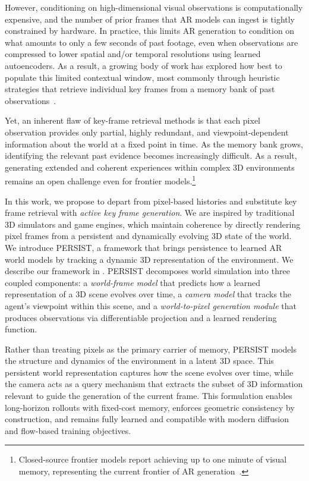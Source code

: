 \documentclass{article}
\theoremstyle{plain}
\theoremstyle{definition}
\theoremstyle{remark}
\begin{document}
However, conditioning on high-dimensional visual observations is computationally expensive, and the number of prior frames that AR models can ingest is tightly constrained by hardware.
In practice, this limits AR generation to condition on what amounts to only a few seconds of past footage, even when observations are compressed to lower spatial and/or temporal resolutions using learned autoencoders.
As a result, a growing body of work has explored how best to populate this limited contextual window, most commonly through heuristic strategies that retrieve individual key frames from a memory bank of past observations~\citep{xiao2025worldmem,huang2025memory}.

Yet, an inherent flaw of key-frame retrieval methods is that each pixel observation provides only partial, highly redundant, and viewpoint-dependent information about the world at a fixed point in time.
As the memory bank grows, identifying the relevant past evidence becomes increasingly difficult.
As a result, generating extended and coherent experiences within complex 3D environments remains an open challenge even for frontier models.\footnote{Closed-source frontier models report achieving up to one minute of visual memory, representing the current frontier of AR generation~\citep{genie3}.}

In this work, we propose to depart from pixel-based histories and substitute key frame retrieval with \textit{active key frame generation}.
We are inspired by traditional 3D simulators and game engines, which maintain coherence by directly rendering pixel frames from a persistent and dynamically evolving 3D state of the world. We introduce PERSIST, a framework that brings persistence to learned AR world models by tracking a dynamic 3D representation of the environment. We describe our framework in .
PERSIST decomposes world simulation into three coupled components: a \textit{world-frame model} that predicts how a learned representation of a 3D scene evolves over time, a \textit{camera model} that tracks the agent’s viewpoint within this scene, and a \textit{world-to-pixel generation module} that produces observations via differentiable projection and a learned rendering function.

Rather than treating pixels as the primary carrier of memory, PERSIST models the structure and dynamics of the environment in a latent 3D space.
This persistent world representation captures how the scene evolves over time, while the camera acts as a query mechanism that extracts the subset of 3D information relevant to guide the generation of the current frame.
This formulation enables long-horizon rollouts with fixed-cost memory, enforces geometric consistency by construction, and remains fully learned and compatible with modern diffusion and flow-based training objectives.
\end{document}
